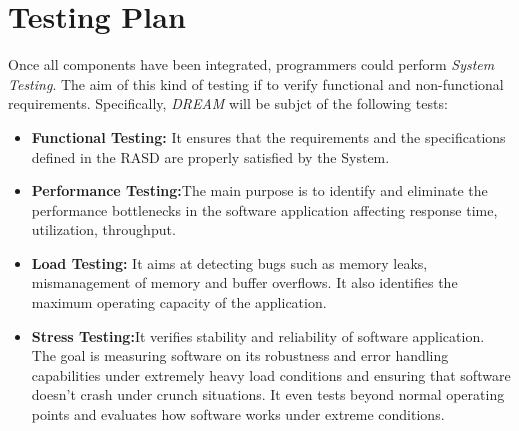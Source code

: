 \section{Testing Plan}

Once all components have been integrated, programmers could perform \textit{System Testing}.
The aim of this kind of testing if to verify functional and non-functional requirements.
Specifically, \textit{DREAM} will be subjct of the following tests:

\begin{itemize}
    \item \textbf{Functional Testing:} It ensures that the requirements and the specifications defined in the RASD are properly satisfied by the System. 
    \item \textbf{Performance Testing:}The main purpose is to identify and eliminate the performance bottlenecks in the software application affecting response time, utilization, throughput.
    \item \textbf{Load Testing:} It aims at detecting bugs such as memory leaks, mismanagement of memory and buffer overflows. It also identifies the maximum operating capacity of the application.
    \item \textbf{Stress Testing:}It verifies stability and reliability of software application. The goal is measuring software on its robustness and error handling capabilities under extremely heavy load conditions and ensuring that software doesn't crash under crunch situations. It even tests beyond normal operating points and evaluates how software works under extreme conditions.
\end{itemize}